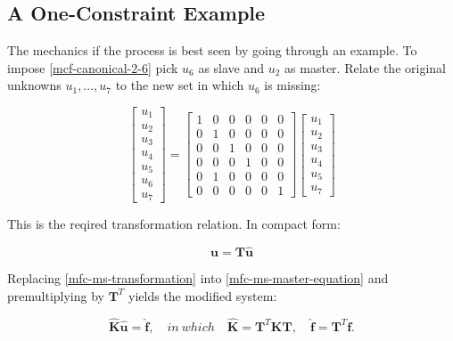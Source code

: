\documentclass[10pt,b5paper,titlepage]{book}
\begin{document}
\subsection{A One-Constraint Example}

The mechanics if the process is best seen by going through an example. To impose
\eqref{mcf-canonical-2-6} pick $ u_6 $ as slave and $ u_2 $ as master. Relate the
original unknowns $ u_1, \dots, u_7 $ to the new set in which $ u_6 $ is missing:

\begin{equation}\label{mfc-ms-transformation}
    \begin{bmatrix}
        u_1 \\
        u_2 \\
        u_3 \\
        u_4 \\
        u_5 \\
        u_6 \\
        u_7
    \end{bmatrix}
    = \begin{bmatrix}
        1 & 0 & 0 & 0 & 0 & 0 \\
        0 & 1 & 0 & 0 & 0 & 0 \\
        0 & 0 & 1 & 0 & 0 & 0 \\
        0 & 0 & 0 & 1 & 0 & 0 \\
        0 & 1 & 0 & 0 & 0 & 0 \\
        0 & 0 & 0 & 0 & 0 & 1
    \end{bmatrix}
    \begin{bmatrix}
        u_1 \\
        u_2 \\
        u_3 \\
        u_4 \\
        u_5 \\
        u_7
    \end{bmatrix}
\end{equation}

This is the reqired transformation relation. In compact form:

\begin{equation}
    \mathbf{u} = \mathbf{T} \mathbf{\hat{u}}
\end{equation}


Replacing \eqref{mfc-ms-transformation} into \eqref{mfc-ms-master-equation} and
premultiplying by $ \mathbf{T}^T $ yields the modified system:

\begin{equation}\label{mfc-ms-modified-system}
    \mathbf{\hat{K}} \mathbf{\hat{u}} = \mathbf{\hat{f}}, \quad
    in\ which \quad \mathbf{\hat{K}} = \mathbf{T}^T \mathbf{K} \mathbf{T}, \quad
    \mathbf{\hat{f}} = \mathbf{T}^T \mathbf{f}.
\end{equation}
\end{document}
